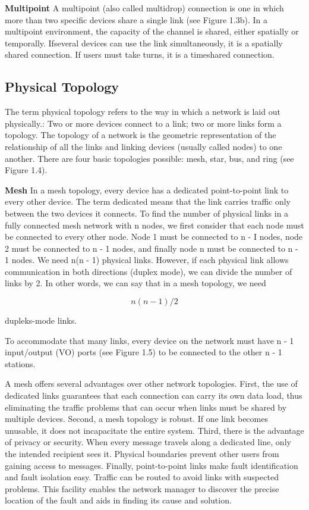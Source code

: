 \textbf{Multipoint} A multipoint (also called multidrop) connection is one in which more than two specific devices share a single link (see Figure 1.3b). In a multipoint environment, the capacity of the channel is shared, either spatially or temporally. Ifseveral devices can use the link simultaneously, it is a spatially shared connection. If users must take turns, it is a timeshared connection.

\subsection*{Physical Topology}
The term physical topology refers to the way in which a network is laid out physically.: Two or more devices connect to a link; two or more links form a topology. The topology of a network is the geometric representation of the relationship of all the links and linking devices (usually called nodes) to one another. There are four basic topologies possible: mesh, star, bus, and ring (see Figure 1.4). 

\textbf{Mesh} In a mesh topology, every device has a dedicated point-to-point link to every other device. The term dedicated means that the link carries traffic only between the two devices it connects. To find the number of physical links in a fully connected mesh network with n nodes, we first consider that each node must be connected to every other node. Node 1 must be connected to n - I nodes, node 2 must be connected to n - 1 nodes, and finally node n must be connected to n - 1 nodes. We need n(n - 1) physical links. However, if each physical link allows communication in both directions (duplex mode), we can divide the number of links by 2. In other words, we can say that in a mesh topology, we need

\begin{equation*}
  n(n - 1)/2
\end{equation*}

\noindent dupleks-mode links.

To accommodate that many links, every device on the network must have n - 1 input/output (VO) ports (see Figure 1.5) to be connected to the other n - 1 stations.

A mesh offers several advantages over other network topologies. First, the use of dedicated links guarantees that each connection can carry its own data load, thus eliminating the traffic problems that can occur when links must be shared by multiple devices. Second, a mesh topology is robust. If one link becomes unusable, it does not incapacitate the entire system. Third, there is the advantage of privacy or security. When every message travels along a dedicated line, only the intended recipient sees it. Physical boundaries prevent other users from gaining access to messages. Finally, point-to-point links make fault identification and fault isolation easy. Traffic can be routed to avoid links with suspected problems. This facility enables the network manager to discover the precise location of the fault and aids in finding its cause and solution.

